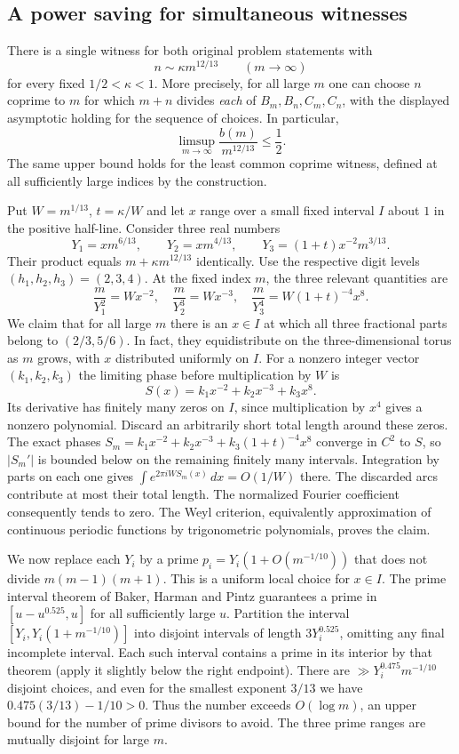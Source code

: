 \documentclass[11pt,a4paper]{article}
\numberwithin{equation}{section}
\begin{document}
\subsection{A power saving for simultaneous witnesses}

There is a single witness for both original problem statements with
\[
 n\sim\kappa m^{12/13}
 \qquad(m\to\infty)
\]
for every fixed $1/2<\kappa<1$. More precisely, for all large $m$
one can choose $n$ coprime to $m$ for which $m+n$ divides
\emph{each} of $B_m,B_n,C_m,C_n$, with the displayed asymptotic
holding for the sequence of choices. In particular,
\[
 \limsup_{m\to\infty}\frac{b(m)}{m^{12/13}}\le\frac12.
\]
The same upper bound holds for the least common coprime witness, defined
at all sufficiently large indices by the construction.

Put $W=m^{1/13}$, $t=\kappa/W$ and let $x$ range over a small
fixed interval $I$ about $1$ in the positive half-line. Consider
three real numbers
\[
 Y_1=x m^{6/13},\qquad Y_2=x m^{4/13},\qquad
 Y_3=(1+t)x^{-2}m^{3/13}.
\]
Their product equals $m+\kappa m^{12/13}$ identically. Use the
respective digit levels $(h_1,h_2,h_3)=(2,3,4)$. At the fixed index
$m$, the three relevant quantities are
\[
 \frac{m}{Y_1^2}=Wx^{-2},\quad
 \frac{m}{Y_2^3}=Wx^{-3},\quad
 \frac{m}{Y_3^4}=W(1+t)^{-4}x^8.
\]
We claim that for all large $m$ there is an $x\in I$ at which all
three fractional parts belong to $(2/3,5/6)$. In fact, they
equidistribute on the three-dimensional torus as $m$ grows, with $x$
distributed uniformly on $I$. For a nonzero integer vector
$(k_1,k_2,k_3)$ the limiting phase before multiplication by $W$ is
\[
 S(x)=k_1 x^{-2}+k_2x^{-3}+k_3x^8 .
\]
Its derivative has finitely many zeros on $I$, since multiplication
by $x^4$ gives a nonzero polynomial. Discard an arbitrarily short
total length around these zeros. The exact phases
$S_m=k_1 x^{-2}+k_2 x^{-3}+k_3(1+t)^{-4}x^8$ converge in $C^2$
to $S$, so $|S_m'|$ is bounded below on the remaining finitely many
intervals. Integration by parts on each one gives
$\int e^{2\pi iW S_m(x)}\,dx=O(1/W)$ there.
The discarded arcs contribute at most their total length.
The normalized Fourier coefficient consequently tends to zero.
The Weyl criterion, equivalently approximation of continuous
periodic functions by trigonometric polynomials, proves the claim.

We now replace each $Y_i$ by a prime
$p_i=Y_i(1+O(m^{-1/10}))$ that does not divide $m(m-1)(m+1)$.
This is a uniform local choice for $x\in I$. The prime interval
theorem of Baker, Harman and Pintz \cite{BHP2001} guarantees a prime
in $[u-u^{0.525},u]$ for all sufficiently large $u$. Partition the
interval $[Y_i,Y_i(1+m^{-1/10})]$ into disjoint intervals of length
$3Y_i^{0.525}$, omitting any final incomplete interval. Each such
interval contains a prime in its interior by that theorem (apply it
slightly below the right endpoint). There are
$\gg Y_i^{0.475}m^{-1/10}$ disjoint choices, and even for the
smallest exponent $3/13$ we have
$0.475(3/13)-1/10>0$. Thus the number exceeds $O(\log m)$, an
upper bound for the number of prime divisors to avoid. The three
prime ranges are mutually disjoint for large $m$.
\end{document}

